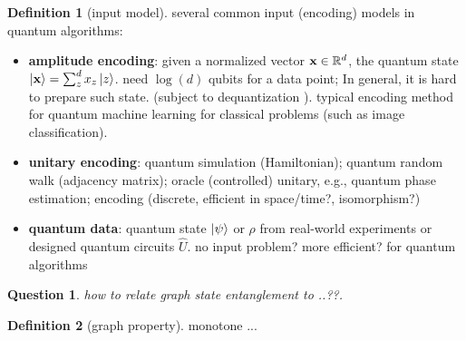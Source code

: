 \documentclass[
10pt,
aps,
pra,
linenumbers,
floatfix,
]{revtex4-2}
\theoremstyle{plain}
\newtheorem{question}{Question}
\theoremstyle{definition}
\newtheorem{definition}{Definition}
\newcommand{\U}{\hat{U}}
\newcommand{\dm}{\rho}
\newcommand{\oracle}{\hat{O}}
\begin{document}
\begin{definition}[input model]\label{def:input_model}
	several common input (encoding) models in quantum algorithms: 
	\begin{itemize}


		\item \textbf{amplitude encoding}: given a normalized vector $\vb{x}\in\mathbb{R}^d$, the quantum state $\ket{\vb{x}}=\sum_z^d x_z\ket{z}$. 
		need $\log(d) $ qubits for a data point; 
		In general, it is hard to prepare such state. (subject to dequantization \cite{tangQuantumPrincipalComponent2021}). 
		typical encoding method for quantum machine learning for classical problems (such as image classification).

		\item \textbf{unitary encoding}: quantum simulation (Hamiltonian); quantum random walk (adjacency matrix); oracle (controlled) unitary, e.g., quantum phase estimation;
		 encoding (discrete, efficient in space/time?, isomorphism?)

		\item \textbf{quantum data}: quantum state $\ket{\psi}$ or $\dm$ from real-world experiments or designed quantum circuits $\U$.
		no input problem? more efficient? for quantum algorithms


	\end{itemize}
\end{definition}
\begin{question}
	how to relate graph state entanglement to 
	..??.
\end{question} 
\begin{definition}[graph property]\label{def:graph_property}
	monotone ...
\end{definition}
\end{document}
